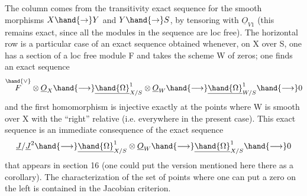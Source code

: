
The column comes from the transitivity exact sequence for the
smooth morphisms $X\hand{\to} Y$ and $Y\hand{\to} S$, by  tensoring with $\underline{O}_{V1}$ (this remains
exact, since all the modules in the sequence are loc free). The horizontal
row is a particular case of an exact sequence obtained whenever,
on X  over S, one has a section \hand{$\mu$} of a loc free module F
and takes the scheme W of zeros; one finds an exact sequence
\[ \overset{\hand{\vee}}{F}\otimes \underline{O}_X \hand{\longrightarrow} \underline{\hand{\Omega}}^1_{X/S}\otimes \underline{O}_W \hand{\longrightarrow} \underline{\hand{\Omega}}^1_{W/S} \hand{\longrightarrow} 0 \]
and  the first homomorphism is injective exactly at the points where
W is smooth over X with the ``right'' relative  (i.e. everywhere in
the present case).  This exact sequence is 
  an
immediate consequence of the exact sequence
\[ \underline{J}/\underline{J}^2\hand{\longrightarrow} \underline{\hand{\Omega}}^1_{X/S}\otimes \underline{O}_W \hand{\longrightarrow} \underline{\hand{\Omega}}^1_{X/S} \hand{\longrightarrow} 0 \]
 that appears in section 16 (one could put the version
mentioned here there as a corollary). The characterization of the set of points where
one can put a zero on the left is contained in the Jacobian criterion.

